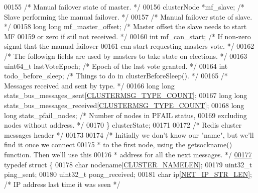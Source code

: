 \begin{DoxyCode}
00155     \textcolor{comment}{/* Manual failover state of master. */}
00156     clusterNode *mf\_slave;      \textcolor{comment}{/* Slave performing the manual failover. */}
00157     \textcolor{comment}{/* Manual failover state of slave. */}
00158     \textcolor{keywordtype}{long} \textcolor{keywordtype}{long} mf\_master\_offset; \textcolor{comment}{/* Master offset the slave needs to start MF}
00159 \textcolor{comment}{                                   or zero if stil not received. */}
00160     \textcolor{keywordtype}{int} mf\_can\_start;           \textcolor{comment}{/* If non-zero signal that the manual failover}
00161 \textcolor{comment}{                                   can start requesting masters vote. */}
00162     \textcolor{comment}{/* The followign fields are used by masters to take state on elections. */}
00163     uint64\_t lastVoteEpoch;     \textcolor{comment}{/* Epoch of the last vote granted. */}
00164     \textcolor{keywordtype}{int} todo\_before\_sleep; \textcolor{comment}{/* Things to do in clusterBeforeSleep(). */}
00165     \textcolor{comment}{/* Messages received and sent by type. */}
00166     \textcolor{keywordtype}{long} \textcolor{keywordtype}{long} stats\_bus\_messages\_sent[\hyperlink{cluster_8h_a6222c464c1f2125f42271d2abd63853e}{CLUSTERMSG\_TYPE\_COUNT}];
00167     \textcolor{keywordtype}{long} \textcolor{keywordtype}{long} stats\_bus\_messages\_received[\hyperlink{cluster_8h_a6222c464c1f2125f42271d2abd63853e}{CLUSTERMSG\_TYPE\_COUNT}];
00168     \textcolor{keywordtype}{long} \textcolor{keywordtype}{long} stats\_pfail\_nodes;    \textcolor{comment}{/* Number of nodes in PFAIL status,}
00169 \textcolor{comment}{                                       excluding nodes without address. */}
00170 \} clusterState;
00171 
00172 \textcolor{comment}{/* Redis cluster messages header */}
00173 
00174 \textcolor{comment}{/* Initially we don't know our "name", but we'll find it once we connect}
00175 \textcolor{comment}{ * to the first node, using the getsockname() function. Then we'll use this}
00176 \textcolor{comment}{ * address for all the next messages. */}
\hyperlink{structclusterMsgDataGossip}{00177} \textcolor{keyword}{typedef} \textcolor{keyword}{struct} \{
00178     \textcolor{keywordtype}{char} nodename[\hyperlink{cluster_8h_ace7a882972eff7149675252938643b6e}{CLUSTER\_NAMELEN}];
00179     uint32\_t ping\_sent;
00180     uint32\_t pong\_received;
00181     \textcolor{keywordtype}{char} ip[\hyperlink{server_8h_ad97c5405ed22a94e9fcc10fba577d6c0}{NET\_IP\_STR\_LEN}];  \textcolor{comment}{/* IP address last time it was seen */}

\end{DoxyCode}
